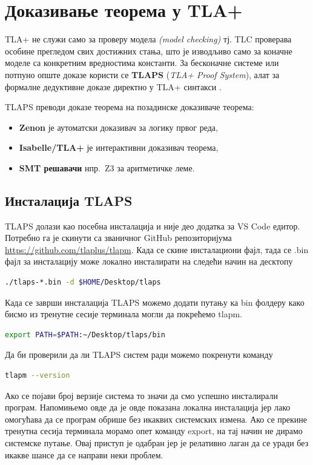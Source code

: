\section{Доказивање теорема у TLA+}

TLA+ не служи само за проверу модела \textit{(model checking)} тј. TLC проверава особине прегледом свих достижних стања,
што је изводљиво само за коначне моделе са конкретним вредностима константи.
За бесконачне системе или потпуно опште доказе користи се \textbf{TLAPS} (\textit{TLA+ Proof System}),
алат за формалне дедуктивне доказе директно у TLA+ синтакси \cite{tlapsProofTactics}.

TLAPS преводи доказе теорема на позадинске доказиваче теорема:
\begin{itemize}
    \item \textbf{Zenon} је аутоматски доказивач за логику првог реда,
    \item \textbf{Isabelle/TLA+} је интерактивни доказивач теорема,
    \item \textbf{SMT решавачи} нпр.\ Z3 за аритметичке леме.
\end{itemize}

\subsection{Инсталација TLAPS}
TLAPS долази као посебна инсталација и није део додатка за VS Code едитор. Потребно га је скинути
са званичног GitHub репозиторијума
\url{https://github.com/tlaplus/tlapm}. Када се скине инсталациони фајл, тада се .bin фајл за инсталацију
може локално инсталирати на следећи начин на десктопу
\begin{lstlisting}[language=bash]
./tlaps-*.bin -d $HOME/Desktop/tlaps
\end{lstlisting}
Када се заврши инсталација TLAPS можемо додати путању ка bin фолдеру како бисмо из тренутне сесије
терминала могли да покрећемо tlapm.
\begin{lstlisting}[language=bash]
export PATH=$PATH:~/Desktop/tlaps/bin
\end{lstlisting}
Да би проверили да ли TLAPS систем ради можемо покренути команду
\begin{lstlisting}[language=bash]
tlapm --version
\end{lstlisting}
Ако се појави број верзије система то значи да смо успешно инсталирали програм.
Напомињемо овде да је овде показана локална инсталација јер лако омогућава да се програм обрише без икаквих
системских измена. Ако се прекине тренутна сесија терминала морамо опет команду export, на тај начин
не дирамо системске путање. Овај приступ је одабран јер је релативно лаган да се уради без икакве шансе да се 
направи неки проблем. 

